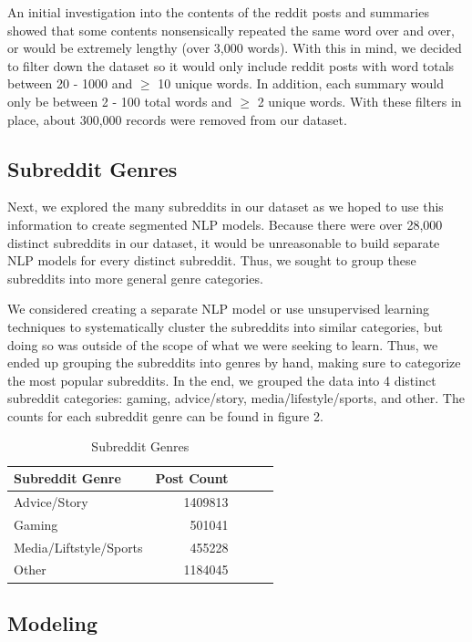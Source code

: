 \documentclass[11pt,a4paper, twocolumn]{article}
\begin{document}
An initial investigation into the contents of the reddit posts and summaries showed that some contents nonsensically repeated 
the same word over and over, or would be extremely lengthy (over 3,000 words). 
With this in mind, we decided to filter down the dataset so it would only include reddit posts 
with word totals between 20 - 1000 and $\geq$ 10 unique words. 
In addition, each summary would only be between 2 - 100 total words and $\geq$ 2 unique words. 
With these filters in place, about 300,000 records were removed from our dataset. 


\subsection{Subreddit Genres}

Next, we explored the many subreddits in our dataset as we hoped to use this information to create segmented NLP models. 
Because there were over 28,000 distinct subreddits in our dataset, it would be unreasonable to build separate NLP models for every distinct subreddit. 
Thus, we sought to group these subreddits into more general genre categories. 


We considered creating a separate NLP model or use unsupervised learning techniques to systematically cluster the subreddits into similar categories, 
but doing so was outside of the scope of what we were seeking to learn. 
Thus, we ended up grouping the subreddits into genres by hand, making sure to categorize the most popular subreddits. 
In the end, we grouped the data into 4 distinct subreddit categories: gaming, advice/story, media/lifestyle/sports, and other. 
The counts for each subreddit genre can be found in figure 2. 

\begin{table}
  \centering
  \begin{tabular}{lrlll}
  \hline \textbf{Subreddit Genre} & \textbf{Post Count}\\ \hline
  Advice/Story & 1409813 \\
  Gaming & 501041 \\
  Media/Liftstyle/Sports & 455228 \\
  Other & 1184045 \\
  \hline
  \end{tabular}
  \caption{\label{font-table} Subreddit Genres}
\end{table}


\subsection{Modeling}
\end{document}
